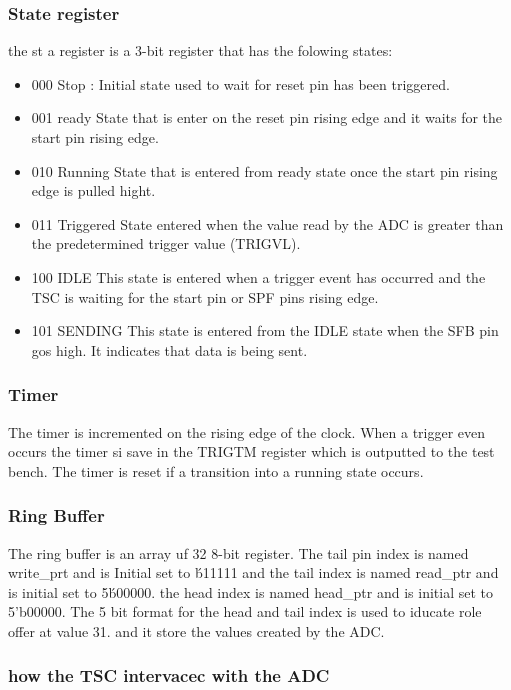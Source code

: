 \subsubsection{State register}
the st a register is a 3-bit register that has the folowing states:
\begin{itemize}
    \item 000 Stop :
          Initial state used to wait for reset pin has been triggered.
    \item 001 ready
          State that is enter on the reset pin rising edge and it waits for the start pin rising edge.
    \item 010 Running
          State that is entered from ready state once the start pin rising edge is pulled hight.
    \item 011 Triggered
          State entered when the value read by the ADC is
          greater than the predetermined trigger value (TRIGVL).
    \item 100 IDLE
          This state is entered when a trigger event has occurred
          and the TSC is waiting for the start pin or SPF pins rising edge.
    \item 101 SENDING
          This state is entered from the IDLE state when the SFB pin gos high. It indicates that data is being sent.
\end{itemize}


\subsubsection{Timer}
The timer is incremented on the rising edge of the clock. When
a trigger even occurs the timer si save in the TRIGTM register which is outputted to the test bench.
The timer is reset if a transition into a running state occurs.

\subsubsection{Ring Buffer}
The ring buffer is an array uf 32 8-bit register.
The tail pin index is named write_prt and is Initial set to \'b11111
and the tail index is named read_ptr and is initial set to 5\'b00000.
the head index is named head_ptr and is initial set to 5'b00000.
The 5 bit format for the head and tail index is used to iducate role offer at value 31.
and it store the values created by the ADC.

\subsubsection{how the TSC intervacec with the ADC}








